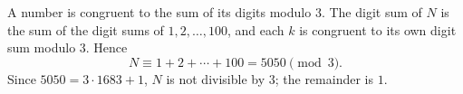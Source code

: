 A number is congruent to the sum of its digits modulo $3$. The digit sum of $N$ is the sum of the digit sums of $1,2,\dots,100$, and each $k$ is congruent to its own digit sum modulo $3$. Hence
\[
N\equiv1+2+\cdots+100=5050\pmod3 .
\]
Since $5050=3\cdot1683+1$, $N$ is not divisible by $3$; the remainder is $\boxed{1}$.
